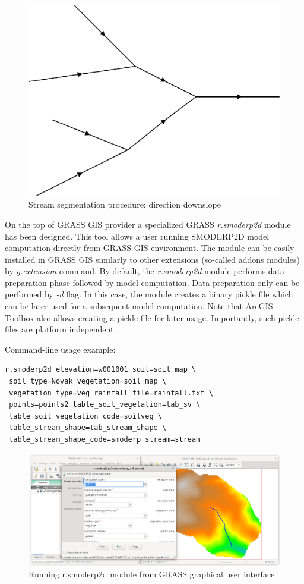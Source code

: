 \begin{figure}[ht!]
  \begin{center}
    \includegraphics[width=0.6\columnwidth]{figures/stream_next_edge}
    \caption{Stream segmentation procedure: direction downslope}
    \label{fig:stream_next_edge}
  \end{center}
\end{figure}

On the top of GRASS GIS provider a specialized GRASS {\em r.smoderp2d}
module has been designed. This tool allows a user running SMODERP2D
model computation directly from GRASS GIS environment. The module can
be easily installed in GRASS GIS similarly to other extensions
(so-called addons modules) by {\em g.extension} command. By default,
the {\em r.smoderp2d} module performs data preparation phase followed by
model computation. Data preparation only can be performed by {\em -d}
flag. In this case, the module creates a binary pickle file which can
be later used for a subsequent model computation. Note that ArcGIS
Toolbox also allows creating a pickle file for later
usage. Importantly, such pickle files are platform independent.

Command-line usage example:
\begin{verbatim}
r.smoderp2d elevation=w001001 soil=soil_map \
 soil_type=Novak vegetation=soil_map \
 vegetation_type=veg rainfall_file=rainfall.txt \
 points=points2 table_soil_vegetation=tab_sv \
 table_soil_vegetation_code=soilveg \
 table_stream_shape=tab_stream_shape \
 table_stream_shape_code=smoderp stream=stream 
\end{verbatim}

\begin{figure}[ht!]
  \begin{center}
    \includegraphics[width=1.0\columnwidth]{figures/smoderp2d_grass.png}
    \caption{Running r.smoderp2d module from GRASS graphical user interface}
    \label{fig:uml_diagram}
  \end{center}
\end{figure}

